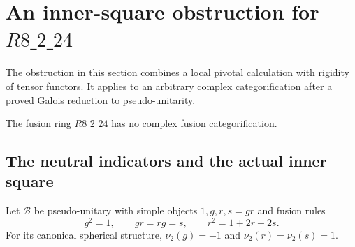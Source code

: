 \section{An inner-square obstruction for \texorpdfstring{$R8\_2\_24$}{R8\_2\_24}}
\label{sec:r24-rigidity}
The obstruction in this section combines a local pivotal calculation with
rigidity of tensor functors. It applies to an arbitrary complex
categorification after a proved Galois reduction to pseudo-unitarity.

\begin{theorem}\label{thm:r24-general-exclusion}
The fusion ring $R8\_2\_24$ has no complex fusion categorification.
\end{theorem}

\subsection{The neutral indicators and the actual inner square}
\begin{lemma}\label{lem:2d2-neutral-indicators}
Let $\mathcal B$ be pseudo-unitary with simple objects $1,g,r,s=gr$
and fusion rules
\begin{equation}\label{eq:r24-neutral-rules}
 g^2=1,\qquad gr=rg=s,\qquad r^2=1+2r+2s.
\end{equation}
For its canonical spherical structure,
$\nu_2(g)=-1$ and $\nu_2(r)=\nu_2(s)=1$.
\end{lemma}
